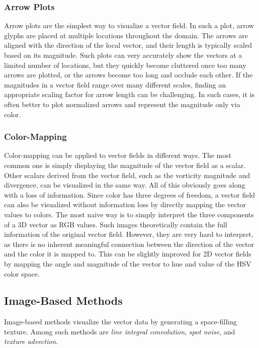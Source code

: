 %
\subsubsection{Arrow Plots}
%
Arrow plots are the simplest way to visualize a vector field.
%
In such a plot, arrow glyphs are placed at multiple locations throughout the
domain.
%
The arrows are aligned with the direction of the local vector, and their
length is typically scaled based on its magnitude.
%
Such plots can very accurately show the vectors at a limited number of
locations, but they quickly become cluttered once too many arrows are plotted,
or the arrows become too long and occlude each other.
%
If the magnitudes in a vector field range over many different scales, finding an
appropriate scaling factor for arrow length can be challenging.
%
In such cases, it is often better to plot normalized arrows and represent the
magnitude only via color.
%

%
\subsubsection{Color-Mapping}
%
Color-mapping can be applied to vector fields in different ways.
%
The most common one is simply displaying the magnitude of the vector field as a
scalar.
%
Other scalars derived from the vector field, such as the vorticity magnitude and
divergence, can be visualized in the same way.
%
All of this obviously goes along with a loss of information.
%
Since color has three degrees of freedom, a vector field can also be visualized
without information loss by directly mapping the vector values to colors.
%
The most naive way is to simply interpret the three components of a \ac{3D}
vector as RGB values.
%
Such images theoretically contain the full information of the original vector
field.
%
However, they are very hard to interpret, as there is no inherent meaningful
connection between the direction of the vector and the color it is mapped to.
%
This can be slightly improved for \ac{2D} vector fields by mapping the angle
and magnitude of the vector to hue and value of the HSV color space.
%
%
\subsection{Image-Based Methods} %
\label{sub:vector_image_based}
%
Image-based methods visualize the vector data by generating a space-filling
texture.
%
Among such methods are \emph{line integral convolution}, \emph{spot noise},
and \emph{texture advection}.
%


